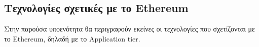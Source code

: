\subsection{Τεχνολογίες σχετικές με το Ethereum}

Στην παρούσα υποενότητα θα περιγραφούν εκείνες οι τεχνολογίες που σχετίζονται με το Ethereum, δηλαδή με το Application tier.


